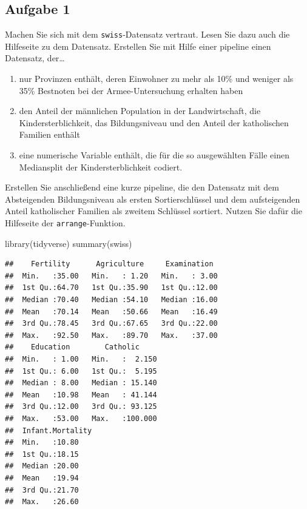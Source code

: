 \documentclass[
]{book}
\newenvironment{Shaded}{\begin{snugshade}}{\end{snugshade}}
\newcommand{\FunctionTok}[1]{\textcolor[rgb]{0.00,0.00,0.00}{#1}}
\newcommand{\NormalTok}[1]{#1}
\begin{document}
\hypertarget{aufgabe-1-1}{%
\subsection{Aufgabe 1}\label{aufgabe-1-1}}

Machen Sie sich mit dem \texttt{swiss}-Datensatz vertraut. Lesen Sie dazu auch die Hilfeseite zu dem Datensatz.
Erstellen Sie mit Hilfe einer pipeline einen Datensatz, der\ldots{}

\begin{enumerate}
\def\labelenumi{\arabic{enumi}.}
\item
  nur Provinzen enthält, deren Einwohner zu mehr als 10\% und weniger als 35\% Bestnoten bei der Armee-Untersuchung erhalten haben
\item
  den Anteil der männlichen Population in der Landwirtschaft, die Kindersterblichkeit, das Bildungsniveau und den Anteil der katholischen Familien enthält
\item
  eine numerische Variable enthält, die für die so ausgewählten Fälle einen Mediansplit der Kindersterblichkeit codiert.
\end{enumerate}

Erstellen Sie anschließend eine kurze pipeline, die den Datensatz mit dem Absteigenden Bildungsniveau als ersten Sortierschlüssel und dem aufsteigenden Anteil katholischer Familien als zweitem Schlüssel sortiert. Nutzen Sie dafür die Hilfeseite der \texttt{arrange}-Funktion.

\hypertarget{solution1}{}
\begin{Shaded}
\begin{Highlighting}[]
\FunctionTok{library}\NormalTok{(tidyverse)}
\FunctionTok{summary}\NormalTok{(swiss)}
\end{Highlighting}
\end{Shaded}

\begin{verbatim}
##    Fertility      Agriculture     Examination   
##  Min.   :35.00   Min.   : 1.20   Min.   : 3.00  
##  1st Qu.:64.70   1st Qu.:35.90   1st Qu.:12.00  
##  Median :70.40   Median :54.10   Median :16.00  
##  Mean   :70.14   Mean   :50.66   Mean   :16.49  
##  3rd Qu.:78.45   3rd Qu.:67.65   3rd Qu.:22.00  
##  Max.   :92.50   Max.   :89.70   Max.   :37.00  
##    Education        Catholic      
##  Min.   : 1.00   Min.   :  2.150  
##  1st Qu.: 6.00   1st Qu.:  5.195  
##  Median : 8.00   Median : 15.140  
##  Mean   :10.98   Mean   : 41.144  
##  3rd Qu.:12.00   3rd Qu.: 93.125  
##  Max.   :53.00   Max.   :100.000  
##  Infant.Mortality
##  Min.   :10.80   
##  1st Qu.:18.15   
##  Median :20.00   
##  Mean   :19.94   
##  3rd Qu.:21.70   
##  Max.   :26.60
\end{verbatim}
\end{document}
